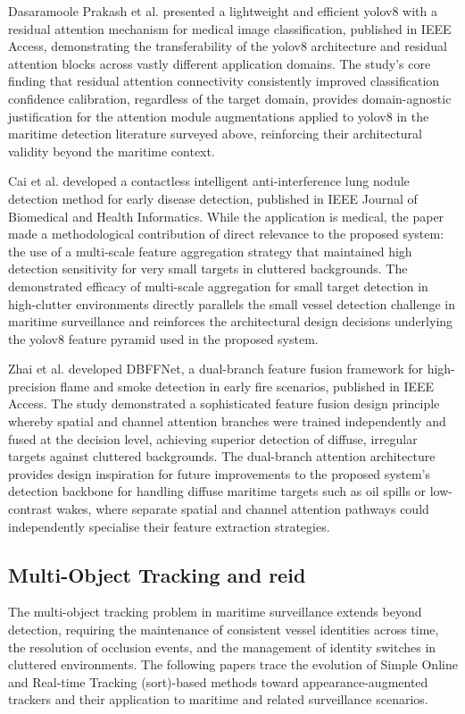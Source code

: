 Dasaramoole Prakash et al. \cite{DasaramoolePrakash2024} presented a lightweight
and efficient \gls{yolov8} with a residual attention mechanism for medical image
classification, published in IEEE Access, demonstrating the transferability of
the \gls{yolov8} architecture and residual attention blocks across vastly different
application domains. The study's core finding that residual attention connectivity
consistently improved classification confidence calibration, regardless of the
target domain, provides domain-agnostic justification for the attention module
augmentations applied to \gls{yolov8} in the maritime detection literature surveyed
above, reinforcing their architectural validity beyond the maritime context.
 
Cai et al. \cite{Cai2026} developed a contactless intelligent anti-interference
lung nodule detection method for early disease detection, published in IEEE
Journal of Biomedical and Health Informatics. While the application is medical,
the paper made a methodological contribution of direct relevance to the proposed
system: the use of a multi-scale feature aggregation strategy that maintained
high detection sensitivity for very small targets in cluttered backgrounds.
The demonstrated efficacy of multi-scale aggregation for small target detection
in high-clutter environments directly parallels the small vessel detection
challenge in maritime surveillance and reinforces the architectural design
decisions underlying the \gls{yolov8} feature pyramid used in the proposed system.
 
Zhai et al. \cite{Zhai2025} developed DBFFNet, a dual-branch feature fusion
framework for high-precision flame and smoke detection in early fire scenarios,
published in IEEE Access. The study demonstrated a sophisticated feature fusion
design principle whereby spatial and channel attention branches were trained
independently and fused at the decision level, achieving superior detection of
diffuse, irregular targets against cluttered backgrounds. The dual-branch attention
architecture provides design inspiration for future improvements to the proposed
system's detection backbone for handling diffuse maritime targets such as oil spills
or low-contrast wakes, where separate spatial and channel attention pathways could
independently specialise their feature extraction strategies.
 
\subsection{Multi-Object Tracking and \texorpdfstring{\gls{reid}}{ReID}}
The multi-object tracking problem in maritime surveillance extends beyond
detection, requiring the maintenance of consistent vessel identities across
time, the resolution of occlusion events, and the management of identity
switches in cluttered environments. The following papers trace the evolution
of Simple Online and Real-time Tracking (\gls{sort})-based methods toward
appearance-augmented trackers and their application to maritime and related
surveillance scenarios.
 
